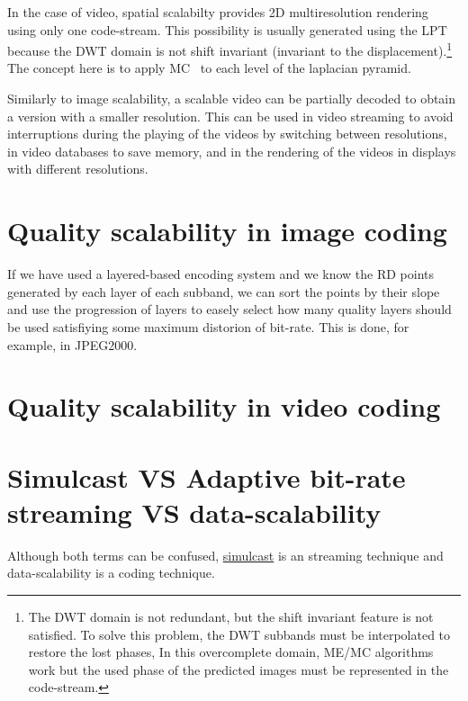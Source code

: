 
In the case of video, spatial scalabilty provides 2D multiresolution
rendering using only one code-stream. This possibility is usually
generated using the LPT because the DWT domain is not shift invariant
(invariant to the displacement).\footnote{The DWT domain is not
  redundant, but the shift invariant feature is not satisfied. To
  solve this problem, the DWT subbands must be interpolated to restore
  the lost phases, In this overcomplete domain, ME/MC algorithms work
  but the used phase of the predicted images must be represented in
  the code-stream.} The concept here is to apply MC~\cite{vruiz__MC}
to each level of the laplacian pyramid.

Similarly to image scalability, a scalable video can be partially
decoded to obtain a version with a smaller resolution. This can be
used in video streaming to avoid interruptions during the playing of
the videos by switching between resolutions, in video databases to
save memory, and in the rendering of the videos in displays with
different resolutions.


\section{Quality scalability in image coding}



If we have used a layered-based encoding system and we know the RD
points generated by each layer of each subband, we can sort the points
by their slope and use the progression of layers to easely select how
many quality layers should be used satisfiying some maximum distorion
of bit-rate. This is done, for example, in JPEG2000.

\section{Quality scalability in video coding}

\section{Simulcast VS Adaptive bit-rate streaming VS data-scalability}


Although both terms can be confused,
\href{https://en.wikipedia.org/wiki/Simulcast}{simulcast} is an
streaming technique and data-scalability is a coding technique.


